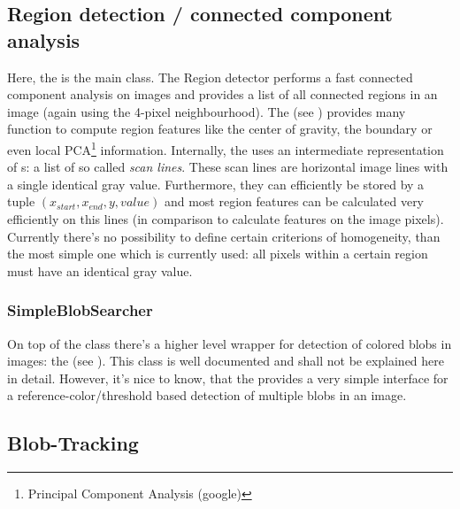 \subsection{Region detection / connected component analysis}
Here, the  is the main class. The Region detector performs a fast connected component analysis on images and provides a list of all connected regions in an image (again using the 4-pixel neighbourhood). The  (see ) provides many function to compute region features like the center of gravity, the boundary or even local PCA\footnote{Principal Component Analysis (google)} information. Internally, the  uses an intermediate representation of s: a list of so called \emph{scan lines}. These scan lines are horizontal image lines with a single identical gray value. Furthermore, they can efficiently be stored by a tuple $(x_{start},x_{end},y,value)$ and most region features can be calculated very efficiently on this lines (in comparison to calculate features on the image pixels). Currently there's no possibility to define certain criterions of homogeneity, than the most simple one which is currently used: all pixels within a certain region must have an identical gray value. 

\subsubsection{SimpleBlobSearcher}

On top of the  class there's a higher level wrapper for detection of colored blobs in images: the  (see ). This class is well documented and shall not be explained here in detail. However, it's nice to know, that the  provides a very simple interface for a reference-color/threshold based detection of multiple blobs in an image.

\subsection{Blob-Tracking}

